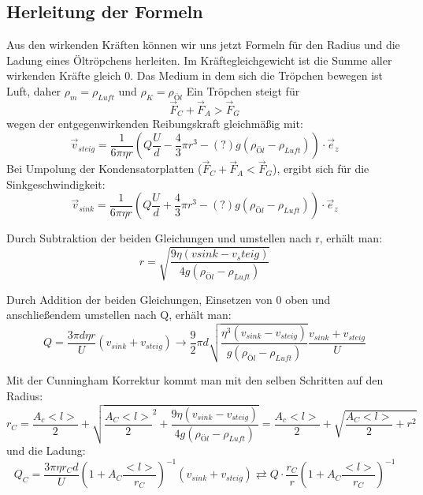\documentclass{scrartcl}
\begin{document}
		\subsection{Herleitung der Formeln}
			Aus den wirkenden Kräften können wir uns jetzt Formeln für den Radius und die Ladung eines Öltröpchens herleiten.
			Im Kräftegleichgewicht ist die Summe aller wirkenden Kräfte gleich 0.
			Das Medium in dem sich die Tröpchen bewegen ist Luft, daher	$\rho_m  = \rho_{Luft}$ und $\rho_K = \rho_{Öl}$
			Ein Tröpchen steigt für
			\begin{equation}
				\vec{F}_C + \vec{F}_A > \vec{F}_G
			\end{equation}
			wegen der entgegenwirkenden  Reibungskraft gleichmäßig mit:
			\begin{equation}
				\vec{v}_{steig} = \frac{1}{6\pi \eta r} (Q \frac{U}{d} - \frac{4}{3}\pi r^3 -(?)g (\rho_{Öl}-\rho_{Luft})) \cdot \vec{e}_z
			\end{equation}
			Bei Umpolung der Kondensatorplatten ($\vec{F}_C + \vec{F}_A < \vec{F}_G$), ergibt sich für die Sinkgeschwindigkeit:
			\begin{equation}
				\vec{v}_{sink} = \frac{1}{6\pi \eta r} (Q \frac{U}{d} + \frac{4}{3}\pi r^3 -(?)g (\rho_{Öl}-\rho_{Luft})) \cdot \vec{e}_z
			\end{equation}

			Durch Subtraktion der beiden Gleichungen und umstellen nach r, erhält man:
			\begin{equation}
				r = \sqrt{\frac{9 \eta (v{sink} - v_steig)}{4 g (\rho_{Öl} - \rho_{Luft})}}
			\end{equation}

			Durch Addition der beiden Gleichungen, Einsetzen von 0 oben und anschließendem umstellen nach Q, erhält man:
			\begin{equation}
				Q = \frac{3 \pi d \eta r}{U} (v_{sink} + v_{steig})
				\rightarrow \frac{9}{2} \pi d \sqrt{\frac{\eta^3 (v_{sink} - v_{steig})}{g (\rho_{Öl} - \rho_{Luft})}} \frac{v_{sink} + v_{steig}}{U} 
			\end{equation}

			Mit der Cunningham Korrektur kommt man mit den selben Schritten auf den Radius:
			\begin{equation}
				r_C = \frac{A_c <l>}{2} + \sqrt{\frac{A_C <l>}{2}^2 +\frac{9 \eta (v_{sink} - v_{steig})}{4 g (\rho_{Öl} - \rho_{Luft})}}
					= \frac{A_c <l>}{2} + \sqrt{\frac{A_C <l>}{2} + r^2}
			\end{equation}
			und die Ladung:
			\begin{equation}
				Q_C = \frac{3 \pi \eta r_C d}{U} (1 + A_C \frac{<l>}{r_C})^{-1} (v_{sink} + v_{steig})
				\rightleftarrows Q \cdot \frac{r_C}{r} (1 + A_C \frac{<l>}{r_C})^{-1} 
			\end{equation}
\end{document}
